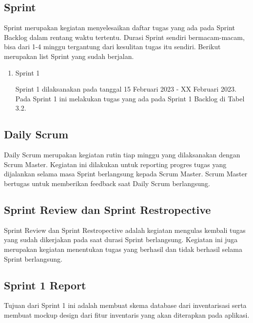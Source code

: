 \subsection{Sprint}

Sprint merupakan kegiatan menyelesaikan daftar tugas yang ada pada Sprint Backlog dalam rentang waktu tertentu. Durasi Sprint sendiri bermacam-macam, bisa dari 1-4 minggu tergantung dari kesulitan tugas itu sendiri. Berikut merupakan list Sprint yang sudah berjalan.

\begin{enumerate}
	\item Sprint 1
	
	Sprint 1 dilaksanakan pada tanggal 15 Februari 2023 - XX Februari 2023. Pada Sprint 1 ini melakukan tugas yang ada pada Sprint 1 Backlog di Tabel 3.2.
\end{enumerate}

\subsection{Daily Scrum}

Daily Scrum merupakan kegiatan rutin tiap minggu yang dilaksanakan dengan Scrum Master. Kegiatan ini dilakukan untuk reporting progres tugas yang dijalankan selama masa Sprint berlangsung kepada Scrum Master. Scrum Master bertugas untuk memberikan feedback saat Daily Scrum berlangsung.

\subsection{Sprint Review dan Sprint Restropective}

Sprint Review dan Sprint Restropective adalah kegiatan mengulas kembali tugas yang sudah dikerjakan pada saat durasi Sprint berlangsung. Kegiatan ini juga merupakan kegiatan menentukan tugas yang berhasil dan tidak berhasil selama Sprint berlangsung.

\subsection{Sprint 1 Report}

Tujuan dari Sprint 1 ini adalah membuat skema database dari inventarisasi serta membuat mockup design dari fitur inventaris yang akan diterapkan pada aplikasi.

